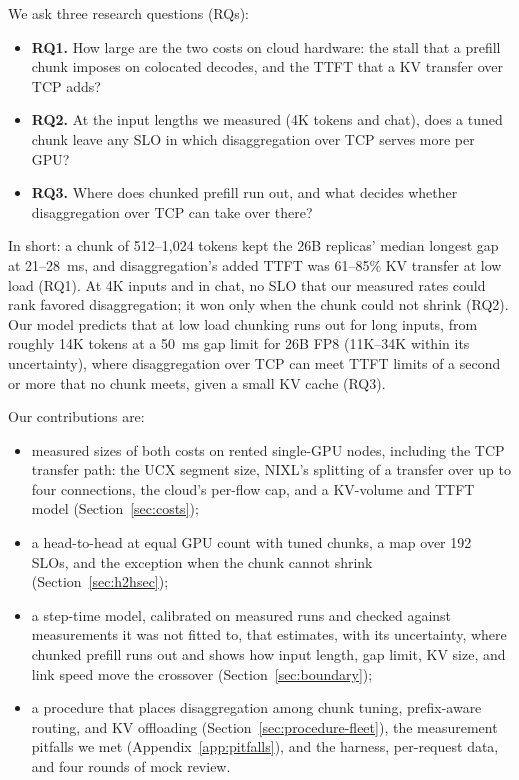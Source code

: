 \documentclass[11pt]{article}
\begin{document}
We ask three research questions (RQs):
\begin{itemize}
  \item \textbf{RQ1.} How large are the two costs on cloud hardware: the stall that a prefill chunk imposes on colocated decodes, and the TTFT that a KV transfer over TCP adds?
  \item \textbf{RQ2.} At the input lengths we measured (4K tokens and chat), does a tuned chunk leave any SLO in which disaggregation over TCP serves more per GPU?
  \item \textbf{RQ3.} Where does chunked prefill run out, and what decides whether disaggregation over TCP can take over there?
\end{itemize}
In short: a chunk of 512--1,024 tokens kept the 26B replicas' median longest gap at 21--28~ms, and disaggregation's added TTFT was 61--85\% KV transfer at low load (RQ1). At 4K inputs and in chat, no SLO that our measured rates could rank favored disaggregation; it won only when the chunk could not shrink (RQ2). Our model predicts that at low load chunking runs out for long inputs, from roughly 14K tokens at a 50~ms gap limit for 26B FP8 (11K--34K within its uncertainty), where disaggregation over TCP can meet TTFT limits of a second or more that no chunk meets, given a small KV cache (RQ3).

Our contributions are:
\begin{itemize}
  \item measured sizes of both costs on rented single-GPU nodes, including the TCP transfer path: the UCX segment size, NIXL's splitting of a transfer over up to four connections, the cloud's per-flow cap, and a KV-volume and TTFT model (Section~\ref{sec:costs});
  \item a head-to-head at equal GPU count with tuned chunks, a map over 192 SLOs, and the exception when the chunk cannot shrink (Section~\ref{sec:h2hsec});
  \item a step-time model, calibrated on measured runs and checked against measurements it was not fitted to, that estimates, with its uncertainty, where chunked prefill runs out and shows how input length, gap limit, KV size, and link speed move the crossover (Section~\ref{sec:boundary});
  \item a procedure that places disaggregation among chunk tuning, prefix-aware routing, and KV offloading (Section~\ref{sec:procedure-fleet}), the measurement pitfalls we met (Appendix~\ref{app:pitfalls}), and the harness, per-request data, and four rounds of mock review.
\end{itemize}
\end{document}
